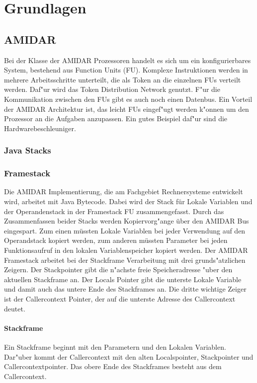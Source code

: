 \chapter{Grundlagen}
\label{cha:Grundlagen}

\section{AMIDAR }
Bei der Klasse der AMIDAR Prozessoren handelt es sich um ein konfigurierbares System, bestehend aus Function Units (FU). Komplexe Instruktionen werden in mehrere Arbeitsschritte unterteilt, die als Token an die einzelnen FUs verteilt werden. Daf"ur wird das Token Distribution Network genutzt. F"ur die Kommunikation zwischen den FUs gibt es auch noch einen Datenbus. Ein Vorteil der AMIDAR Architektur ist, das leicht FUs eingef"ugt werden k"onnen um den Prozessor an die Aufgaben anzupassen. Ein gutes Beispiel daf"ur sind die Hardwarebeschleuniger. \cite{Burkert}\cite{Andresen}
\subsection{Java Stacks}


\subsection{Framestack}
Die AMIDAR Implementierung, die am Fachgebiet Rechnersysteme entwickelt wird, arbeitet mit Java Bytecode. Dabei wird der Stack für Lokale Variablen und der Operandenstack in der Framestack FU zusammengefasst. Durch das Zusammenfassen beider Stacks werden Kopiervorg"ange über den AMIDAR Bus eingespart. Zum einen müssten Lokale Variablen bei jeder Verwendung auf den Operandstack kopiert werden, zum anderen müssten Parameter bei jeden Funktionsaufruf in den lokalen Variablenspeicher kopiert werden.
Der AMIDAR Framestack arbeitet bei der Stackframe Verarbeitung mit drei grunds"atzlichen Zeigern. Der Stackpointer gibt die n"achste freie Speicheradresse "uber den aktuellen Stackframe an. Der Locals Pointer gibt die unterste Lokale Variable und damit auch das untere Ende des Stackframes an. Die dritte wichtige Zeiger ist der Callercontext Pointer, der auf die unterste Adresse des Callercontext deutet. \cite{Illy}

\subsubsection{Stackframe}
Ein Stackframe beginnt mit den Parametern und den Lokalen Variablen.  Dar"uber kommt der Callercontext mit den alten Localspointer, Stackpointer und Callercontextpointer. Das obere Ende des Stackframes besteht aus dem Callercontext. 
\cite{Illy}

